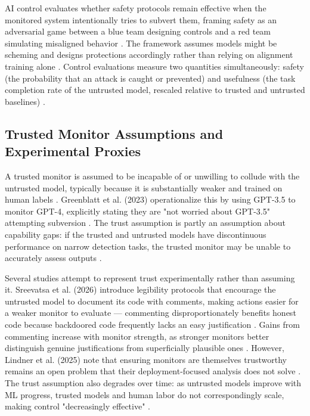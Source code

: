AI control evaluates whether safety protocols remain effective when the monitored system intentionally tries to subvert them, framing safety as an adversarial game between a blue team designing controls and a red team simulating misaligned behavior  \cite{Greenblatt2023AI} \cite{Korbak2025How} \cite{Sreevatsa2026Basic}. The framework assumes models might be scheming and designs protections accordingly rather than relying on alignment training alone  \cite{Korbak2025How} \cite{Lee2026Training}. Control evaluations measure two quantities simultaneously: safety (the probability that an attack is caught or prevented) and usefulness (the task completion rate of the untrusted model, rescaled relative to trusted and untrusted baselines)  \cite{Greenblatt2023AI} \cite{Sreevatsa2026Basic}.


\subsection*{Trusted Monitor Assumptions and Experimental Proxies}


A trusted monitor is assumed to be incapable of or unwilling to collude with the untrusted model, typically because it is substantially weaker and trained on human labels  \cite{Greenblatt2023AI} \cite{Korbak2025A}. Greenblatt et al. (2023) operationalize this by using GPT-3.5 to monitor GPT-4, explicitly stating they are "not worried about GPT-3.5" attempting subversion  \cite{Greenblatt2023AI}. The trust assumption is partly an assumption about capability gaps: if the trusted and untrusted models have discontinuous performance on narrow detection tasks, the trusted monitor may be unable to accurately assess outputs  \cite{Anwar2024Foundational}.


Several studies attempt to represent trust experimentally rather than assuming it. Sreevatsa et al. (2026) introduce legibility protocols that encourage the untrusted model to document its code with comments, making actions easier for a weaker monitor to evaluate — commenting disproportionately benefits honest code because backdoored code frequently lacks an easy justification  \cite{Sreevatsa2026Basic}. Gains from commenting increase with monitor strength, as stronger monitors better distinguish genuine justifications from superficially plausible ones  \cite{Sreevatsa2026Basic}. However, Lindner et al. (2025) note that ensuring monitors are themselves trustworthy remains an open problem that their deployment-focused analysis does not solve  \cite{Lindner2025Practical}. The trust assumption also degrades over time: as untrusted models improve with ML progress, trusted models and human labor do not correspondingly scale, making control "decreasingly effective"  \cite{Greenblatt2023AI}.



